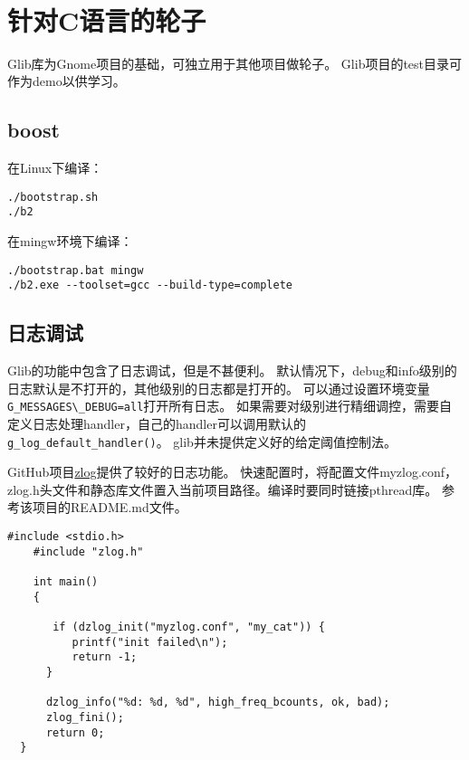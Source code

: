 ﻿%

\section{针对C语言的轮子}
Glib库为Gnome项目的基础，可独立用于其他项目做轮子。
Glib项目的test目录可作为demo以供学习。

\subsection{boost}

在Linux下编译：
\begin{verbatim}
./bootstrap.sh
./b2
\end{verbatim}

在mingw环境下编译：
\begin{verbatim}
./bootstrap.bat mingw
./b2.exe --toolset=gcc --build-type=complete
\end{verbatim}


\subsection{日志调试}

Glib的功能中包含了日志调试，但是不甚便利。
默认情况下，debug和info级别的日志默认是不打开的，其他级别的日志都是打开的。
可以通过设置环境变量\verb$G_MESSAGES\_DEBUG=all$打开所有日志。
如果需要对级别进行精细调控，需要自定义日志处理handler，自己的handler可以调用默认的\verb$g_log_default_handler()$。
glib并未提供定义好的给定阈值控制法。

GitHub项目\href{https://github.com/HardySimpson/zlog}{zlog}提供了较好的日志功能。
快速配置时，将配置文件myzlog.conf，zlog.h头文件和静态库文件置入当前项目路径。编译时要同时链接pthread库。
参考该项目的README.md文件。
\begin{verbatim}
#include <stdio.h>
    #include "zlog.h"

    int main()
    {

       if (dzlog_init("myzlog.conf", "my_cat")) {
          printf("init failed\n");
          return -1;
      }

      dzlog_info("%d: %d, %d", high_freq_bcounts, ok, bad);
      zlog_fini();
      return 0;
  }

\end{verbatim}
